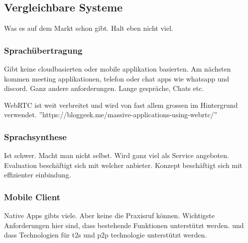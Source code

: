 \subsection{Vergleichbare Systeme}

Was es auf dem Markt schon gibt.
Halt eben nicht viel.

\subsubsection{Sprachübertragung}

Gibt keine cloudbasierten oder mobile applikation basierten.
Am nächsten kommen meeting applikationen, telefon oder chat apps wie whatsapp und discord.
Ganz andere anforderungen.
Lange gespräche, Chats etc.

WebRTC ist weit verbreitet und wird von fast allem grossen im Hintergrund verwendet.
''https://bloggeek.me/massive-applications-using-webrtc/''

\subsubsection{Sprachsynthese}
Ist schwer.
Macht man nicht selbst.
Wird ganz viel als Service angeboten.
Evaluation beschäftigt sich mit welcher anbieter.
Konzept beschäftigt sich mit effizienter einbindung.

\subsubsection{Mobile Client}
Native Apps gibts viele.
Aber keine die Praxisruf können.
Wichtigste Anforderungen hier sind, dass bestehende Funktionen unterstützt werden.
und dass Technologien für t2s und p2p technologie unterstützt werden.

\clearpage

